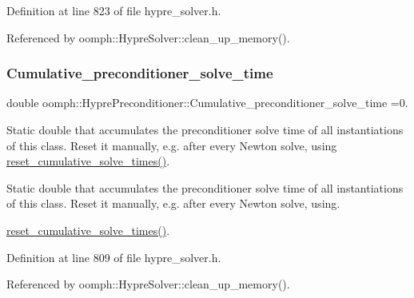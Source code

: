 Definition at line 823 of file hypre\+\_\+solver.\+h.



Referenced by oomph\+::\+Hypre\+Solver\+::clean\+\_\+up\+\_\+memory().

\mbox{\label{classoomph_1_1HyprePreconditioner_a53f01c25e89f237bd46c14f029f34a46}} 
\subsubsection{\texorpdfstring{Cumulative\+\_\+preconditioner\+\_\+solve\+\_\+time}{Cumulative\_preconditioner\_solve\_time}}
{\footnotesize\ttfamily double oomph\+::\+Hypre\+Preconditioner\+::\+Cumulative\+\_\+preconditioner\+\_\+solve\+\_\+time =0.\hspace{0.3cm}{\ttfamily [static]}}



Static double that accumulates the preconditioner solve time of all instantiations of this class. Reset it manually, e.\+g. after every Newton solve, using \hyperlink{classoomph_1_1HyprePreconditioner_a126763a53b2c687bc1b150d0fc64fbb6}{reset\+\_\+cumulative\+\_\+solve\+\_\+times()}. 

Static double that accumulates the preconditioner solve time of all instantiations of this class. Reset it manually, e.\+g. after every Newton solve, using.

\hyperlink{classoomph_1_1HyprePreconditioner_a126763a53b2c687bc1b150d0fc64fbb6}{reset\+\_\+cumulative\+\_\+solve\+\_\+times()}. 

Definition at line 809 of file hypre\+\_\+solver.\+h.



Referenced by oomph\+::\+Hypre\+Solver\+::clean\+\_\+up\+\_\+memory().

\mbox{\label{classoomph_1_1HyprePreconditioner_a73c88c3da340f7c3fe9857521b463176}} 
